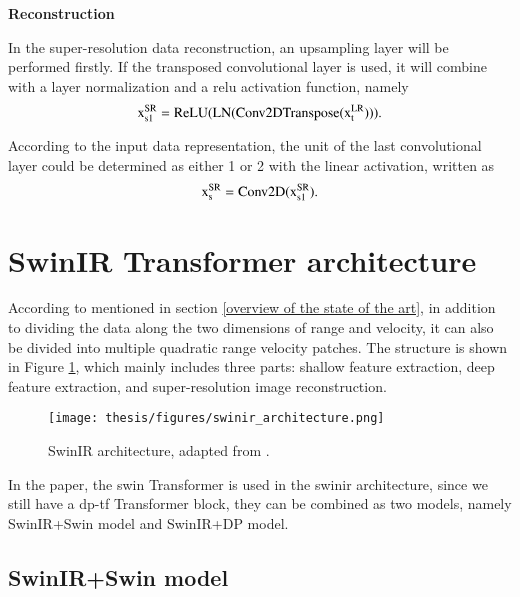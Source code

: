 \begin{spacing}{1.5}
\textbf{\large{Reconstruction}}
\end{spacing}

In the super-resolution data reconstruction, an upsampling layer will be performed firstly. If the transposed convolutional layer is used, it will combine with a layer normalization and a \gls{relu} activation function, namely
\begin{equation}
    \centering
    \mathrm{x^{SR}_{s1} = ReLU(LN(Conv2DTranspose(x^{LR}_t)))}.
    \label{separator1 equation}
\end{equation}

According to the input data representation, the unit of the last convolutional layer could be determined as either 1 or 2 with the linear activation, written as
\begin{equation}
    \centering
    \mathrm{x^{SR}_s = Conv2D(x^{SR}_{s1})}.
    \label{separator2 equation}
\end{equation}

\section{SwinIR Transformer architecture} \label{swinir transformer architecture}
According to \cite{liang_swinir_2021} mentioned in section \ref{overview of the state of the art}, in addition to dividing the data along the two dimensions of range and velocity, it can also be divided into multiple quadratic range velocity patches. The structure is shown in Figure \ref{swinir_architecture}, which mainly includes three parts: shallow feature extraction, deep feature extraction, and super-resolution image reconstruction.

\begin{figure}
	\centering
	\texttt{[image: thesis/figures/swinir\_architecture.png]}
	\caption{SwinIR architecture, adapted from \cite{liang_swinir_2021}.}
	\label{swinir_architecture}
\end{figure}

In the paper, the \gls{swin} Transformer is used in the \gls{swinir} architecture, since we still have a \gls{dp}-\gls{tf} Transformer block, they can be combined as two models, namely SwinIR+Swin model and SwinIR+DP model.

\subsection{SwinIR+Swin model}

